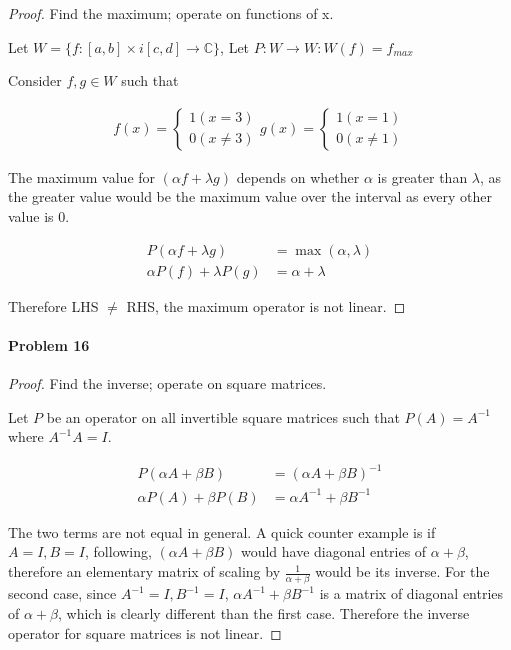 \documentclass{article}
\begin{document}
\begin{proof}
Find the maximum; operate on functions of x.

Let $W = \{f : [a, b] \times i[c, d] \to \mathbb{C} \}$, Let $P : W \to W : W(f) = f_{max}$

Consider $f, g \in W$ such that

\begin{align*}
f(x) = \begin{cases}
1 (x = 3)\\
0 (x \neq 3)
\end{cases}
g(x) = \begin{cases}
1 (x = 1)\\
0 (x \neq 1)
\end{cases}
\end{align*}

The maximum value for $(\alpha f + \lambda g)$ depends on whether $\alpha$ is greater than $\lambda$, as the greater value would be the maximum value over the interval as every other value is 0.

\begin{align*}
P(\alpha f + \lambda g) &= \max{(\alpha, \lambda)} \\
\alpha P(f) + \lambda P(g) &= \alpha + \lambda
\end{align*}

Therefore LHS $\neq$ RHS, the maximum operator is not linear.
\end{proof}

\paragraph{Problem 16}
\begin{proof}

Find the inverse; operate on square matrices.

Let $P$ be an operator on all invertible square matrices such that $P(A) = A^{-1}$ where $A^{-1} A = I$.

\begin{align*}
P(\alpha A + \beta B) &= (\alpha A + \beta B)^{-1} \\
\alpha P(A) + \beta P(B) &= \alpha A^{-1} + \beta B^{-1}
\end{align*}

The two terms are not equal in general. A quick counter example is if $A = I, B = I$, following, $(\alpha A + \beta B)$ would have diagonal entries of $\alpha + \beta$, therefore an elementary matrix of scaling by $\frac{1}{\alpha + \beta}$ would be its inverse. For the second case, since $A^{-1} = I, B^{-1} = I$, $\alpha A^{-1} + \beta B^{-1}$ is a matrix of diagonal entries of $\alpha + \beta$, which is clearly different than the first case. Therefore the inverse operator for square matrices is not linear.

\end{proof}
\end{document}
